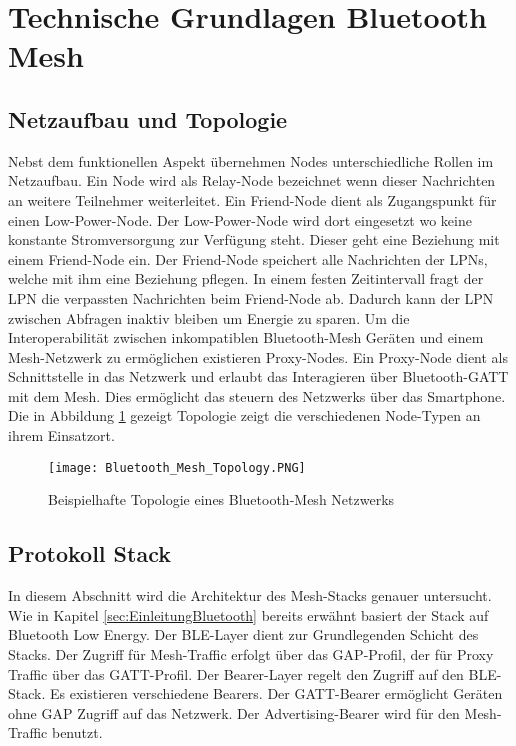 \clearpage
\section{Technische Grundlagen Bluetooth Mesh}\label{sec:TechnischeGrundlagenBluetoothMesh}




\subsection{Netzaufbau und Topologie}\label{sec:NetzaufbauundTopologie}

Nebst dem funktionellen Aspekt übernehmen Nodes unterschiedliche Rollen im Netzaufbau. Ein Node wird als Relay-Node bezeichnet wenn dieser Nachrichten an weitere Teilnehmer weiterleitet. Ein Friend-Node dient als Zugangspunkt für einen Low-Power-Node. Der Low-Power-Node wird dort eingesetzt wo keine konstante Stromversorgung zur Verfügung steht. Dieser geht eine Beziehung mit einem Friend-Node ein. Der Friend-Node speichert alle Nachrichten der LPNs, welche mit ihm eine Beziehung pflegen. In einem festen Zeitintervall fragt der LPN die verpassten Nachrichten beim Friend-Node ab. Dadurch kann der LPN zwischen Abfragen inaktiv bleiben um Energie zu sparen. Um die Interoperabilität zwischen inkompatiblen Bluetooth-Mesh Geräten und einem Mesh-Netzwerk zu ermöglichen existieren Proxy-Nodes. Ein Proxy-Node dient als Schnittstelle in das Netzwerk und erlaubt das Interagieren über Bluetooth-GATT mit dem Mesh. Dies ermöglicht das steuern des Netzwerks über das Smartphone. Die in Abbildung \ref{fig:BTMeshTopology} gezeigt Topologie zeigt die verschiedenen Node-Typen an ihrem Einsatzort. 

\begin{figure} [H]
	\centering
	\texttt{[image: Bluetooth\_Mesh\_Topology.PNG]}
	\caption{Beispielhafte Topologie eines Bluetooth-Mesh Netzwerks \cite{bluetooth_sig_mesh_netzwerk_spezifikationen_2020}} 
	\label{fig:BTMeshTopology}
\end{figure}


\subsection{Protokoll Stack}\label{sec:BLEMeshProtokollStack}

In diesem Abschnitt wird die Architektur des Mesh-Stacks genauer untersucht. Wie in Kapitel \ref{sec:EinleitungBluetooth} bereits erwähnt basiert der Stack auf Bluetooth Low Energy. Der BLE-Layer dient zur Grundlegenden Schicht des Stacks. Der Zugriff für Mesh-Traffic erfolgt über das GAP-Profil, der für Proxy Traffic über das GATT-Profil. Der Bearer-Layer regelt den Zugriff auf den BLE-Stack. Es existieren verschiedene Bearers. Der GATT-Bearer ermöglicht Geräten ohne GAP Zugriff auf das Netzwerk. Der Advertising-Bearer wird für den Mesh-Traffic benutzt. \\

